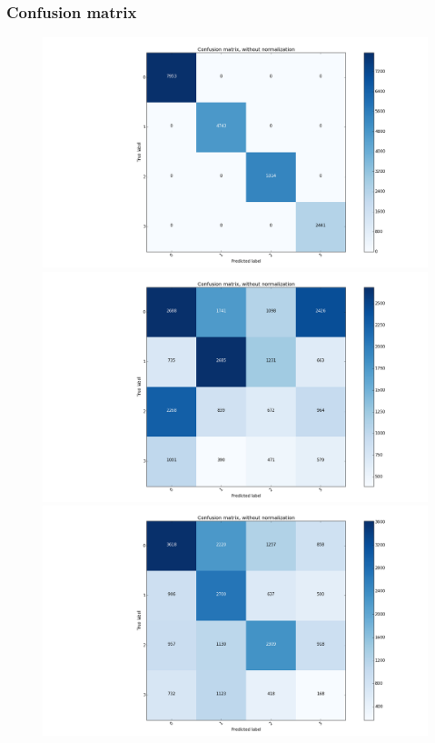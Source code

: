 \documentclass{beamer}
\begin{document}
\begin{frame}
\frametitle{Confusion matrix}
\begin{figure} 
  \label{confusion} 
  \begin{minipage}[b]{0.5\linewidth}
    \centering
    \includegraphics[width=1\linewidth]{../REPORT/label_distribution.png} 
    \vspace{2ex}
  \end{minipage}%
  \begin{minipage}[b]{0.5\linewidth}
    \centering
    \includegraphics[width=1\linewidth]{../REPORT/kmeans2.png} 
    \vspace{2ex}
  \end{minipage} 
  \begin{minipage}[b]{0.5\linewidth}
    \centering
    \includegraphics[width=1\linewidth]{../REPORT/bestModel2.png} 

\end{minipage}
\end{figure}
\end{frame}
\end{document}
